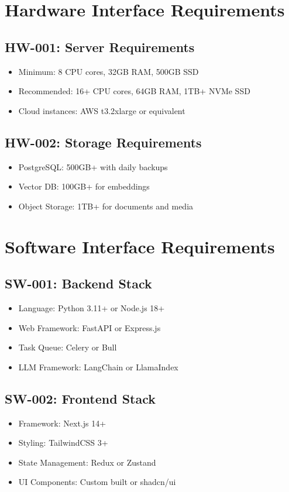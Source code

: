 \documentclass{report}
\begin{document}
\section{Hardware Interface Requirements}

\subsection{HW-001: Server Requirements}
\begin{itemize}
    \item Minimum: 8 CPU cores, 32GB RAM, 500GB SSD
    \item Recommended: 16+ CPU cores, 64GB RAM, 1TB+ NVMe SSD
    \item Cloud instances: AWS t3.2xlarge or equivalent
\end{itemize}

\subsection{HW-002: Storage Requirements}
\begin{itemize}
    \item PostgreSQL: 500GB+ with daily backups
    \item Vector DB: 100GB+ for embeddings
    \item Object Storage: 1TB+ for documents and media
\end{itemize}

\section{Software Interface Requirements}

\subsection{SW-001: Backend Stack}
\begin{itemize}
    \item Language: Python 3.11+ or Node.js 18+
    \item Web Framework: FastAPI or Express.js
    \item Task Queue: Celery or Bull
    \item LLM Framework: LangChain or LlamaIndex
\end{itemize}

\subsection{SW-002: Frontend Stack}
\begin{itemize}
    \item Framework: Next.js 14+
    \item Styling: TailwindCSS 3+
    \item State Management: Redux or Zustand
    \item UI Components: Custom built or shadcn/ui
\end{itemize}
\end{document}

